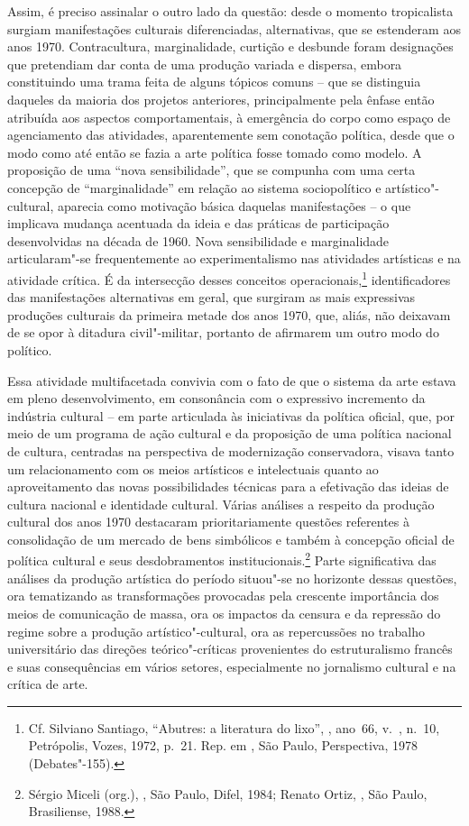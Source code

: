 Assim, é preciso assinalar o outro lado da questão: desde o momento
tropicalista surgiam manifestações culturais diferenciadas,
alternativas, que se estenderam aos anos 1970. Contracultura,
marginalidade, curtição e desbunde foram designações que pretendiam dar
conta de uma produção variada e dispersa, embora constituindo uma trama
feita de alguns tópicos comuns -- que se distinguia daqueles da maioria
dos projetos anteriores, principalmente pela ênfase então atribuída aos
aspectos comportamentais, à emergência do corpo como espaço de
agenciamento das atividades, aparentemente sem conotação política, desde
que o modo como até então se fazia a arte política fosse tomado como
modelo. A proposição de uma ``nova sensibilidade'', que se compunha com
uma certa concepção de ``marginalidade'' em relação ao sistema
sociopolítico e artístico"-cultural, aparecia como motivação básica
daquelas manifestações -- o que implicava mudança acentuada da ideia e
das práticas de participação desenvolvidas na década de 1960. Nova
sensibilidade e marginalidade articularam"-se frequentemente ao
experimentalismo nas atividades artísticas e na atividade crítica. É da
intersecção desses conceitos operacionais,\footnote{Cf. Silviano
  Santiago, ``Abutres: a literatura do lixo'', {},
  ano~66, v.~, n.~10, Petrópolis, Vozes, 1972, p.~21. Rep. em
  {}, São Paulo, Perspectiva, 1978
  (Debates"-155).} identificadores das manifestações alternativas em
geral, que surgiram as mais expressivas produções culturais da primeira
metade dos anos 1970, que, aliás, não deixavam de se opor à ditadura civil"-militar, portanto de afirmarem um outro modo do político.

Essa atividade multifacetada convivia com o fato de que o sistema da
arte estava em pleno desenvolvimento, em consonância com o expressivo
incremento da indústria cultural -- em parte articulada às iniciativas
da política oficial, que, por meio de um programa de ação cultural e da
proposição de uma política nacional de cultura, centradas na perspectiva
de modernização conservadora, visava tanto um relacionamento com os
meios artísticos e intelectuais quanto ao aproveitamento das novas
possibilidades técnicas para a efetivação das ideias de cultura nacional
e identidade cultural. Várias análises a respeito da produção
cultural dos anos 1970 destacaram prioritariamente questões
referentes à consolidação de um mercado de bens simbólicos e também
à concepção oficial de política cultural e seus
desdobramentos institucionais.\footnote{Sérgio Miceli (org.),
  {}, São Paulo, Difel, 1984; Renato
  Ortiz, {}, São Paulo, Brasiliense,
  1988.} Parte significativa das análises da produção artística do
período situou"-se no horizonte dessas questões, ora tematizando as
transformações provocadas pela crescente importância dos meios de
comunicação de massa, ora os impactos da censura e da repressão do
regime sobre a produção artístico"-cultural, ora as repercussões
no trabalho universitário das direções teórico"-críticas provenientes do
estruturalismo francês e suas consequências em vários setores,
especialmente no jornalismo cultural e na crítica de arte.

